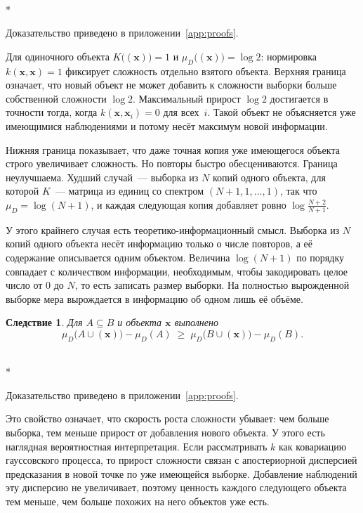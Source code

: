 \documentclass[14pt, a4paper]{extarticle}
\makeatletter
\theoremstyle{definition}
\theoremstyle{plain}
\newtheorem{corollary}[definition]{Следствие}
\renewenvironment{proof}[1][\proofname]{\par
    \pushQED{\qed}%
    \normalfont \topsep6\p@\@plus6\p@\relax
    \trivlist
    \item[\hskip\labelsep\itshape #1\@addpunct{.}]\mbox{}\\*
    \ignorespaces
}{\popQED\endtrivlist\@endpefalse}
\makeatother
\begin{document}
\begin{proof}
Доказательство приведено в приложении~\ref{app:proofs}.
\end{proof}


Для одиночного объекта $K\big((\mathbf{x})\big)=1$
и $\mu_D\big((\mathbf{x})\big)=\log2$: нормировка $k(\mathbf{x},\mathbf{x})=1$
фиксирует сложность отдельно взятого объекта. Верхняя граница означает, что
новый объект не может добавить к сложности выборки больше собственной сложности
$\log2$. Максимальный прирост $\log2$ достигается в точности тогда, 
когда $k(\mathbf{x},\mathbf{x}_i)=0$ для всех~$i$. Такой объект не объясняется уже
имеющимися наблюдениями и потому несёт максимум новой информации.

Нижняя граница показывает, что даже точная копия уже имеющегося объекта строго
увеличивает сложность. Но повторы быстро
обесцениваются. Граница неулучшаема. Худший случай~--- выборка из $N$ копий одного
объекта, для которой $K$~--- матрица из единиц со спектром $(N+1,1,\dots,1)$, так
что $\mu_D=\log(N+1)$, и каждая следующая копия добавляет ровно
$\log\frac{N+2}{N+1}$.

У этого крайнего случая есть теоретико-информационный смысл. Выборка из $N$ копий
одного объекта несёт информацию только о числе повторов, а её содержание
описывается одним объектом. Величина $\log(N+1)$ по порядку совпадает с
количеством информации, необходимым, чтобы закодировать целое число от $0$ до $N$,
то есть записать размер выборки. На полностью вырожденной выборке мера вырождается в информацию об одном лишь
её объёме.

\begin{corollary}
\label{cor:submodular}
Для $A\subseteq B$ и объекта $\mathbf{x}$ выполнено
\[
    \mu_D\big(A\cup(\mathbf{x})\big)-\mu_D(A)
    \;\ge\;
    \mu_D\big(B\cup(\mathbf{x})\big)-\mu_D(B).
\]
\end{corollary}

\begin{proof}
Доказательство приведено в приложении~\ref{app:proofs}.
\end{proof}

Это свойство означает, что скорость роста сложности убывает: чем больше
выборка, тем меньше прирост от добавления нового объекта. У этого есть наглядная
вероятностная интерпретация. Если рассматривать $k$ как ковариацию гауссовского
процесса, то прирост сложности связан с апостериорной дисперсией предсказания в
новой точке по уже имеющейся выборке. Добавление наблюдений эту дисперсию не
увеличивает, поэтому ценность каждого следующего объекта тем меньше, чем больше
похожих на него объектов уже есть.
\end{document}
